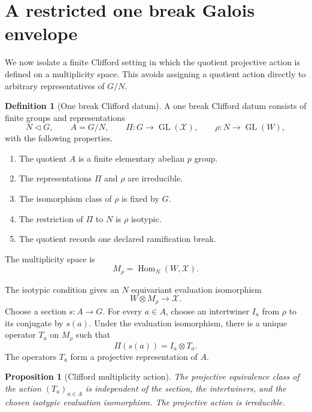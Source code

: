 \documentclass[11pt]{amsart}
\newtheorem{proposition}[proposition]{Proposition}
\theoremstyle{definition}
\newtheorem{definition}[definition]{Definition}
\theoremstyle{remark}
\newcommand{\GL}{\operatorname{GL}}
\newcommand{\Hom}{\operatorname{Hom}}
\newcommand{\calX}{\mathcal X}
\begin{document}
\section{A restricted one break Galois envelope}\label{sec:onebreak}

We now isolate a finite Clifford setting in which the quotient projective action is defined on a multiplicity space. This avoids assigning a quotient action directly to arbitrary representatives of \(G/N\).

\begin{definition}[One break Clifford datum]\label{def:one_break_datum}
A one break Clifford datum consists of finite groups and representations
\[
N\triangleleft G,
\qquad
A=G/N,
\qquad
\Pi:G\to\GL(\calX),
\qquad
\rho:N\to\GL(W),
\]
with the following properties.

\begin{enumerate}
\item The quotient \(A\) is a finite elementary abelian \(p\) group.
\item The representations \(\Pi\) and \(\rho\) are irreducible.
\item The isomorphism class of \(\rho\) is fixed by \(G\).
\item The restriction of \(\Pi\) to \(N\) is \(\rho\) isotypic.
\item The quotient records one declared ramification break.
\end{enumerate}

The multiplicity space is
\[
M_\rho=\Hom_N(W,\calX).
\]
\end{definition}

The isotypic condition gives an \(N\) equivariant evaluation isomorphism
\[
W\otimes M_\rho
\longrightarrow
\calX.
\]
Choose a section \(s:A\to G\). For every \(a\in A\), choose an intertwiner \(I_a\) from \(\rho\) to its conjugate by \(s(a)\). Under the evaluation isomorphism, there is a unique operator \(T_a\) on \(M_\rho\) such that
\[
\Pi(s(a))=I_a\otimes T_a.
\]
The operators \(T_a\) form a projective representation of \(A\).

\begin{proposition}[Clifford multiplicity action]\label{prop:clifford_action}
The projective equivalence class of the action \((T_a)_{a\in A}\) is independent of the section, the intertwiners, and the chosen isotypic evaluation isomorphism. The projective action is irreducible.
\end{proposition}
\end{document}
